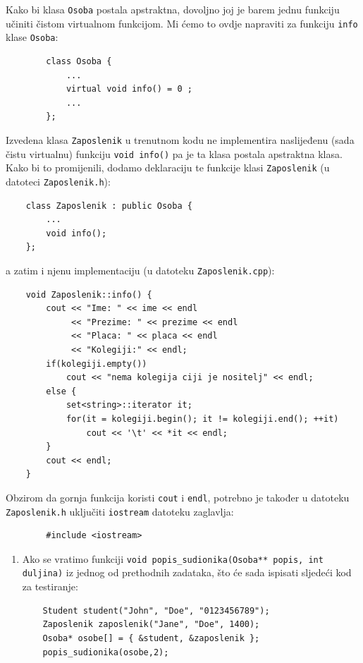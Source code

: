 \begin{rjesenje}
    Kako bi klasa \texttt{Osoba} postala apstraktna, dovoljno joj je barem jednu funkciju
    učiniti čistom virtualnom funkcijom.
    Mi ćemo to ovdje napraviti za funkciju \texttt{info} klase \texttt{Osoba}:

    \begin{verbatim}
        class Osoba {
            ...
            virtual void info() = 0 ;
            ...
        };
    \end{verbatim}

    Izvedena klasa \texttt{Zaposlenik} u trenutnom kodu ne implementira naslijeđenu
    (sada čistu virtualnu) funkciju \texttt{void info()}
    pa je ta klasa postala apstraktna klasa.
    Kako bi to promijenili, dodamo deklaraciju te funkcije klasi \texttt{Zaposlenik}
    (u datoteci \texttt{Zaposlenik.h}):

    \begin{verbatim}
    class Zaposlenik : public Osoba {
        ...
        void info();
    };
    \end{verbatim}

    a zatim i njenu implementaciju (u datoteku \texttt{Zaposlenik.cpp}):
    \begin{verbatim}
    void Zaposlenik::info() {
        cout << "Ime: " << ime << endl
             << "Prezime: " << prezime << endl
             << "Placa: " << placa << endl
             << "Kolegiji:" << endl;
        if(kolegiji.empty())
            cout << "nema kolegija ciji je nositelj" << endl;
        else {
            set<string>::iterator it;
            for(it = kolegiji.begin(); it != kolegiji.end(); ++it)
                cout << '\t' << *it << endl;
        }
        cout << endl;
    }
    \end{verbatim}

    Obzirom da gornja funkcija koristi \texttt{cout} i \texttt{endl},
    potrebno je također u datoteku \texttt{Zaposlenik.h} uključiti 
    \texttt{iostream} datoteku zaglavlja:
    \begin{verbatim}
        #include <iostream>
    \end{verbatim}
\end{rjesenje}


\begin{razmisljanje}
    \begin{enumerate}
        \item 
        Ako se vratimo funkciji \texttt{void popis\_sudionika(Osoba** popis, int duljina)}
        iz jednog od prethodnih zadataka, 
        što će sada ispisati sljedeći kod za testiranje:

        \begin{verbatim}
    Student student("John", "Doe", "0123456789");
    Zaposlenik zaposlenik("Jane", "Doe", 1400);
    Osoba* osobe[] = { &student, &zaposlenik };
    popis_sudionika(osobe,2);
        \end{verbatim}
    \end{enumerate}
\end{razmisljanje}